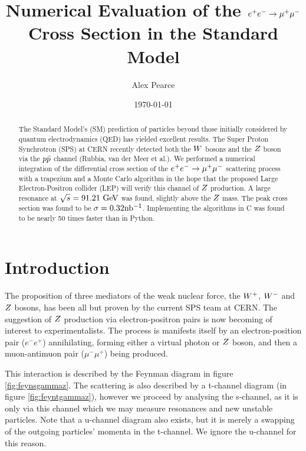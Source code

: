 \documentclass[]{article}
\begin{document}
\title{Numerical Evaluation of the $e^+ e^-  \rightarrow \mathrm{\mu^+ \mu^-} $ Cross Section in the Standard Model}
\author{Alex Pearce}
\date{\today}
\maketitle


\begin{abstract}
The Standard Model's (SM) prediction of particles beyond those initially considered by quantum electrodynamics (QED) has yielded excellent results. The Super Proton Synchrotron (SPS) at CERN recently detected both the $W $ bosons and the $Z $ boson via the $p\bar{p}$ channel (Rubbia, van der Meer et al.). We performed a numerical integration of the differential cross section of the $e^+ e^-  \rightarrow \mathrm{\mu^+ \mu^-} $ scattering process with a trapezium and a Monte Carlo algorithm in the hope that the proposed Large Electron-Positron collider (LEP) will verify this channel of $Z $ production. A large resonance at $\sqrt{s}=91.21\GeV$ was found, slightly above the $Z $ mass. The peak cross section was found to be $\sigma=0.32\mbox{nb$^{-1}$} $. Implementing the algorithms in C was found to be nearly 50 times faster than in Python.
\end{abstract}


\section{Introduction}\label{sec:intro}

The proposition of three mediators of the weak nuclear force, the $W^+ $, $W^- $ and $Z $ bosons, has been all but proven by the current SPS team at CERN. The suggestion of $Z $ production via electron-positron pairs is now becoming of interest to experimentalists. The process is manifests itself by an electron-position pair ($e^{-}e^{+}$) annihilating, forming either a virtual photon or $Z $ boson, and then a muon-antimuon pair ($\mu^{-}\mu^{+}$) being produced.

This interaction is described by the Feynman diagram in figure \ref{fig:feynsgammaz}. The scattering is also described by a t-channel diagram (in figure \ref{fig:feyntgammaz}), however we proceed by analysing the s-channel, as it is only via this channel which we may measure resonances and new unstable particles. Note that a u-channel diagram also exists, but it is merely a swapping of the outgoing particles' momenta in the t-channel. We ignore the u-channel for this reason.
\end{document}
